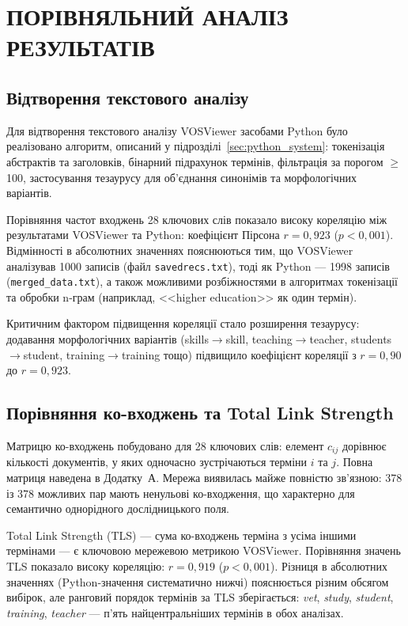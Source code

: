 \section{\MakeUppercase{Порівняльний аналіз результатів}}
\label{sec:chapter3}

\subsection{Відтворення текстового аналізу}
\label{sec:text_mining}

Для відтворення текстового аналізу VOSViewer засобами Python було реалізовано алгоритм, описаний у підрозділі~\ref{sec:python_system}: токенізація абстрактів та заголовків, бінарний підрахунок термінів, фільтрація за порогом $\geq$100, застосування тезаурусу для об'єднання синонімів та морфологічних варіантів.

Порівняння частот входжень 28 ключових слів показало високу кореляцію між результатами VOSViewer та Python: коефіцієнт Пірсона $r = 0{,}923$ ($p < 0{,}001$). Відмінності в абсолютних значеннях пояснюються тим, що VOSViewer аналізував 1000 записів (файл \texttt{savedrecs.txt}), тоді як Python --- 1998 записів (\texttt{merged\_data.txt}), а також можливими розбіжностями в алгоритмах токенізації та обробки n-грам (наприклад, <<higher education>> як один термін).

Критичним фактором підвищення кореляції стало розширення тезаурусу: додавання морфологічних варіантів (skills$\to$skill, teaching$\to$teacher, students$\to$student, training$\to$training тощо) підвищило коефіцієнт кореляції з $r = 0{,}90$ до $r = 0{,}923$.

\subsection{Порівняння ко-входжень та Total Link Strength}
\label{sec:cooccurrence}

Матрицю ко-входжень побудовано для 28 ключових слів: елемент $c_{ij}$ дорівнює кількості документів, у яких одночасно зустрічаються терміни $i$ та $j$. Повна матриця наведена в Додатку~А. Мережа виявилась майже повністю зв'язною: 378 із 378 можливих пар мають ненульові ко-входження, що характерно для семантично однорідного дослідницького поля.

Total Link Strength (TLS) --- сума ко-входжень терміна з усіма іншими термінами --- є ключовою мережевою метрикою VOSViewer. Порівняння значень TLS показало високу кореляцію: $r = 0{,}919$ ($p < 0{,}001$). Різниця в абсолютних значеннях (Python-значення систематично нижчі) пояснюється різним обсягом вибірок, але ранговий порядок термінів за TLS зберігається: \textit{vet}, \textit{study}, \textit{student}, \textit{training}, \textit{teacher} --- п'ять найцентральніших термінів в обох аналізах.

